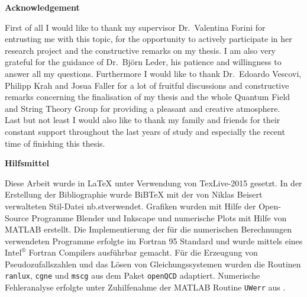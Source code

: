 \begin{center}
{\sffamily \bfseries\Large Acknowledgement}\\
\end{center}%
\vspace{1cm}
%
First of all I would like to thank my supervisor Dr.~Valentina Forini for entrusting me with this topic, for the opportunity to actively participate in her research project and the constructive remarks on my thesis. I am also very grateful for the guidance of Dr.~Björn Leder, his patience and willingness to answer all my questions. Furthermore I would like to thank Dr.~Edoardo Vescovi, Philipp Krah and Josua Faller for a lot of fruitful discussions and constructive remarks concerning the finalisation of my thesis and the whole Quantum Field and String Theory Group for providing a pleasant and creative atmosphere.\\
Last but not least I would also like to thank my family and friends for their constant support throughout the last years of study and especially the recent time of finishing this thesis.\\
%
%
%
\vspace{3cm}
%
\begin{center}
{\sffamily \bfseries\Large Hilfsmittel}\\
\end{center}%
\vspace{1cm}
Diese Arbeit wurde in \LaTeX{ } unter Verwendung von TexLive-2015 gesetzt. In der Erstellung der Bibliographie wurde BiBTeX mit der von Niklas Beisert verwalteten Stil-Datei \glqq nb.st\grqq{ }verwendet. Grafiken wurden mit Hilfe der Open-Source Programme Blender und Inkscape und numerische Plots mit Hilfe von MATLAB erstellt. Die Implementierung der für die numerischen Berechnungen verwendeten Programme erfolgte im {\sc Fortran 95} Standard und wurde mittels eines $\text{Intel}^{\circledR}$ Fortran Compilers ausführbar gemacht. Für die Erzeugung von Pseudozufallszahlen und das Lösen von Gleichungssystemen wurden die Routinen \texttt{ranlux}, \texttt{cgne} und \texttt{mscg} aus dem Paket \texttt{openQCD} adaptiert. Numerische Fehleranalyse erfolgte unter Zuhilfenahme der MATLAB Routine \texttt{UWerr} aus \cite{Wolff:2003sm}.